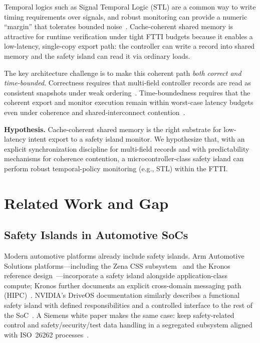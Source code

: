 \documentclass[letterpaper,twocolumn,10pt]{article}
\newcommand{\SafetyIsland}{safety island\xspace}
\newcommand{\STL}{STL\xspace}
\newcommand{\FTTI}{FTTI\xspace}
\begin{document}
Temporal logics such as Signal Temporal Logic (\STL) are a common way to write timing requirements over signals, and robust monitoring can provide a numeric ``margin'' that tolerates bounded noise~\cite{MalerNickovic2004,FainekosPappas2009,Deshmukh2017}. Cache-coherent shared memory is attractive for runtime verification under tight \FTTI budgets because it enables a low-latency, single-copy export path: the controller can write a record into shared memory and the \SafetyIsland can read it via ordinary loads.

The key architecture challenge is to make this coherent path \emph{both correct and time-bounded}. Correctness requires that multi-field controller records are read as consistent snapshots under weak ordering~\cite{Pulte2018SimplifyingARM}. Time-boundedness requires that the coherent export and monitor execution remain within worst-case latency budgets even under coherence and shared-interconnect contention~\cite{Hassan2017PredictableCoherence,Hassan2022IntegratingCOTSCoherence}.

\textbf{Hypothesis.} Cache-coherent shared memory is the right substrate for low-latency intent export to a \SafetyIsland monitor. We hypothesize that, with an explicit synchronization discipline for multi-field records and with predictability mechanisms for coherence contention, a microcontroller-class \SafetyIsland can perform robust temporal-policy monitoring (e.g., \STL) within the \FTTI.

\section{Related Work and Gap}
\subsection{Safety Islands in Automotive SoCs}
Modern automotive platforms already include safety islands. Arm Automotive Solutions platforms---including the Zena CSS subsystem~\cite{ArmZenaCSS} and the Kronos reference design~\cite{ArmAutoSolutionsOverview}---incorporate a safety island alongside application-class compute; Kronos further documents an explicit cross-domain messaging path (HIPC)~\cite{ArmHIPC}. NVIDIA's DriveOS documentation similarly describes a functional safety island with defined responsibilities and a controlled interface to the rest of the SoC~\cite{NVIDIADriveFSI}. A Siemens white paper makes the same case: keep safety-related control and safety/security/test data handling in a segregated subsystem aligned with ISO~26262 processes~\cite{SiemensSI}.
\end{document}
